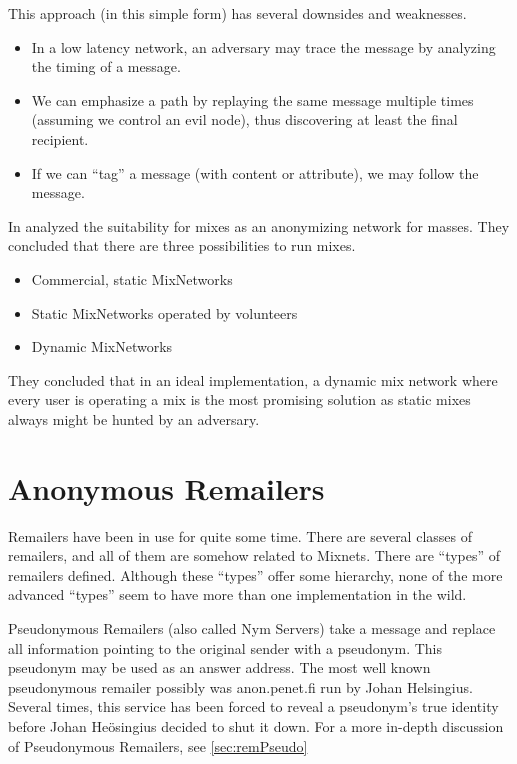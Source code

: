 This approach (in this simple form) has several downsides and weaknesses.

\begin{itemize}
	\item In a low latency network, an adversary may trace the message by analyzing the timing of a message.
	\item We can emphasize a path by replaying the same message multiple times (assuming we control an evil node), thus discovering at least the final recipient.
	\item If we can ``tag'' a message (with content or attribute), we may follow the message.
\end{itemize}

In \citeyear{RP03-1} \citeauthor{RP03-1} analyzed the suitability for mixes as an anonymizing network for masses. They concluded that there are three possibilities to run mixes.
\begin{itemize}
	\item Commercial, static MixNetworks
	\item Static MixNetworks operated by volunteers
	\item Dynamic MixNetworks
\end{itemize}
They concluded that in an ideal implementation, a dynamic mix network where every user is operating a mix is the most promising solution as static mixes always might be hunted by an adversary.

\section{Anonymous Remailers\label{sec:remailers}}
Remailers have been in use for quite some time. There are several classes of remailers, and all of them are somehow related to Mixnets. There are ``types'' of remailers defined. Although these ``types'' offer some hierarchy, none of the more advanced ``types'' seem to have more than one implementation in the wild. 

Pseudonymous Remailers (also called Nym Servers) take a message and replace all information pointing to the original sender with a pseudonym. This pseudonym may be used as an answer address. The most well known pseudonymous remailer possibly was anon.penet.fi run by Johan Helsingius. Several times, this service has been forced to reveal a pseudonym's true identity before Johan Heösingius decided to shut it down. For a more in-depth discussion of Pseudonymous Remailers, see \ref{sec:remPseudo}

